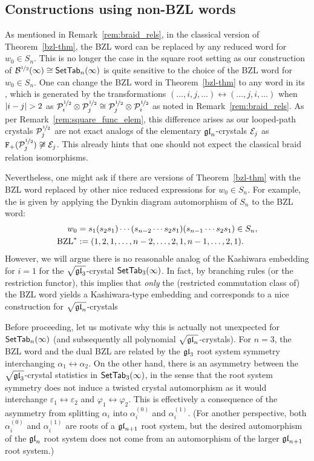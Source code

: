 \documentclass[11pt]{article}
\begin{document}
\subsection{Constructions using non-BZL words}
\label{sec:nonBZL}

As mentioned in Remark~\ref{rem:braid_rels}, in the classical version of Theorem~\ref{bzl-thm}, the BZL word can be replaced by any reduced word for $w_0 \in S_n$.
This is no longer the case in the square root setting as our construction of $\sqrtB(\infty) \iso \SetTab_n(\infty) $ is quite sensitive to the choice of the BZL word for $w_0 \in S_n$.
One can change the BZL word in Theorem~\ref{bzl-thm} to any word in its , which is generated by the transformations $(\dots,i,j,\dots) \leftrightarrow (\dots,j,i,\dots)$ when $\abs{i-j} > 2$ as $\sqrtE_i\otimes \sqrtE_j \iso \sqrtE_j\otimes \sqrtE_i$ as noted in Remark~\ref{rem:braid_rels}.
As per Remark~\ref{rem:square_func_elem}, this difference arises as our looped-path crystals $\sqrtE_{j}$ are not exact analogs of the elementary $\gl_n$-crystals $\cE_j$ as $\defectF{2}(\sqrtE_j) \not\iso \cE_j$.
This already hints that one should not expect the classical braid relation isomorphisms. 

Nevertheless, one might ask if there are versions of Theorem~\ref{bzl-thm} with the BZL word replaced by other nice reduced expressions for $w_0 \in S_n$.
For example, the  is given by applying the Dynkin diagram automorphism of $S_n$
to the BZL word:
\begin{align*}
w_0 & = s_1 (s_2 s_1) \cdots (s_{n-2} \cdots s_2 s_1) (s_{n-1} \cdots s_2 s_1) \in S_n,
\\
\BZL^* & := (1, 2,1, \dotsc, n-2, \dotsc, 2, 1, n-1, \dotsc, 2, 1).
\end{align*}
However, we will argue there is no reasonable analog of the Kashiwara embedding for $i = 1$ for the $\sqrt{\gl_3}$-crystal $\SetTab_3(\infty)$.
In fact, by branching rules (or the restriction functor), this implies that \emph{only} the (restricted commutation class of) the BZL word yields a Kashiwara-type embedding and corresponds to a nice construction for $\sqgln$-crystals

Before proceeding, let us motivate why this is actually not unexpected for $\SetTab_n(\infty)$ (and subsequently all polynomial $\sqgln$-crystals).
For $n = 3$, the BZL word and the dual BZL are related by the $\gl_3$ root system symmetry interchanging $\alpha_1 \leftrightarrow \alpha_2$.
On the other hand, there is an asymmetry between the $\sqrt{\gl_3}$-crystal statistics in $\SetTab_3(\infty)$, in the sense that the root system symmetry does not induce a twisted crystal automorphism as it would interchange $\varepsilon_1 \leftrightarrow \varepsilon_2$ and $\varphi_1 \leftrightarrow \varphi_2$.
This is effectively a consequence of the asymmetry from splitting $\alpha_i$ into $\alpha_i^{(0)}$ and $\alpha_i^{(1)}$.
(For another perspective, both $\alpha_i^{(0)}$ and $\alpha_i^{(1)}$ are roots of a $\gl_{n+1}$ root system, but the desired automorphism of the $\gl_n$ root system does not come from an automorphism of the larger $\gl_{n+1}$ root system.)
\end{document}
